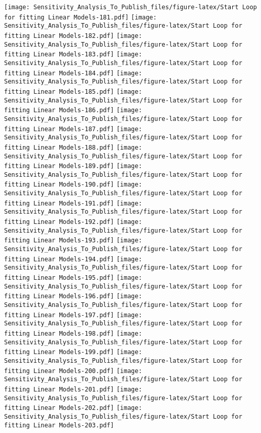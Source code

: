 \documentclass[
]{article}
\begin{document}
\texttt{[image: Sensitivity\_Analysis\_To\_Publish\_files/figure-latex/Start Loop for fitting Linear Models-181.pdf]}
\texttt{[image: Sensitivity\_Analysis\_To\_Publish\_files/figure-latex/Start Loop for fitting Linear Models-182.pdf]}
\texttt{[image: Sensitivity\_Analysis\_To\_Publish\_files/figure-latex/Start Loop for fitting Linear Models-183.pdf]}
\texttt{[image: Sensitivity\_Analysis\_To\_Publish\_files/figure-latex/Start Loop for fitting Linear Models-184.pdf]}
\texttt{[image: Sensitivity\_Analysis\_To\_Publish\_files/figure-latex/Start Loop for fitting Linear Models-185.pdf]}
\texttt{[image: Sensitivity\_Analysis\_To\_Publish\_files/figure-latex/Start Loop for fitting Linear Models-186.pdf]}
\texttt{[image: Sensitivity\_Analysis\_To\_Publish\_files/figure-latex/Start Loop for fitting Linear Models-187.pdf]}
\texttt{[image: Sensitivity\_Analysis\_To\_Publish\_files/figure-latex/Start Loop for fitting Linear Models-188.pdf]}
\texttt{[image: Sensitivity\_Analysis\_To\_Publish\_files/figure-latex/Start Loop for fitting Linear Models-189.pdf]}
\texttt{[image: Sensitivity\_Analysis\_To\_Publish\_files/figure-latex/Start Loop for fitting Linear Models-190.pdf]}
\texttt{[image: Sensitivity\_Analysis\_To\_Publish\_files/figure-latex/Start Loop for fitting Linear Models-191.pdf]}
\texttt{[image: Sensitivity\_Analysis\_To\_Publish\_files/figure-latex/Start Loop for fitting Linear Models-192.pdf]}
\texttt{[image: Sensitivity\_Analysis\_To\_Publish\_files/figure-latex/Start Loop for fitting Linear Models-193.pdf]}
\texttt{[image: Sensitivity\_Analysis\_To\_Publish\_files/figure-latex/Start Loop for fitting Linear Models-194.pdf]}
\texttt{[image: Sensitivity\_Analysis\_To\_Publish\_files/figure-latex/Start Loop for fitting Linear Models-195.pdf]}
\texttt{[image: Sensitivity\_Analysis\_To\_Publish\_files/figure-latex/Start Loop for fitting Linear Models-196.pdf]}
\texttt{[image: Sensitivity\_Analysis\_To\_Publish\_files/figure-latex/Start Loop for fitting Linear Models-197.pdf]}
\texttt{[image: Sensitivity\_Analysis\_To\_Publish\_files/figure-latex/Start Loop for fitting Linear Models-198.pdf]}
\texttt{[image: Sensitivity\_Analysis\_To\_Publish\_files/figure-latex/Start Loop for fitting Linear Models-199.pdf]}
\texttt{[image: Sensitivity\_Analysis\_To\_Publish\_files/figure-latex/Start Loop for fitting Linear Models-200.pdf]}
\texttt{[image: Sensitivity\_Analysis\_To\_Publish\_files/figure-latex/Start Loop for fitting Linear Models-201.pdf]}
\texttt{[image: Sensitivity\_Analysis\_To\_Publish\_files/figure-latex/Start Loop for fitting Linear Models-202.pdf]}
\texttt{[image: Sensitivity\_Analysis\_To\_Publish\_files/figure-latex/Start Loop for fitting Linear Models-203.pdf]}
\end{document}
